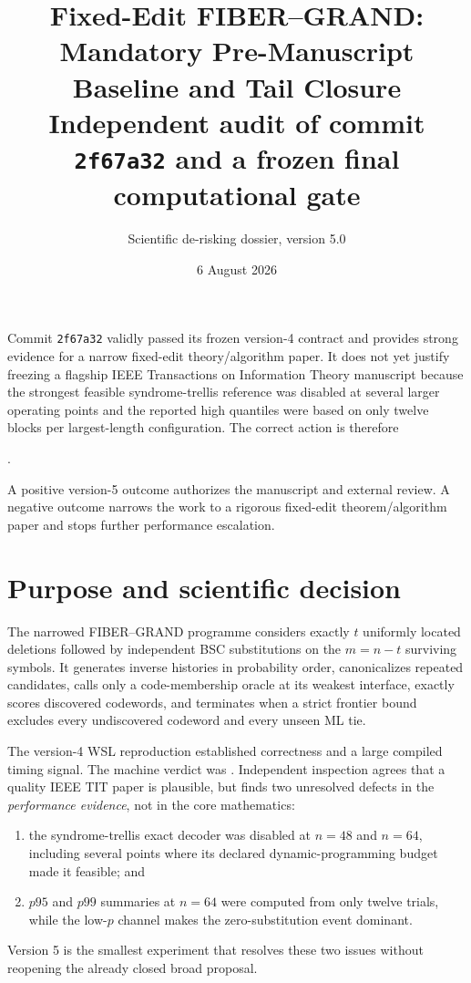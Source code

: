 \documentclass[11pt]{article}
\title{\textbf{Fixed-Edit FIBER--GRAND: Mandatory Pre-Manuscript Baseline and Tail Closure}\\[1.5mm]
\large Independent audit of commit \texttt{2f67a32} and a frozen final computational gate}
\author{Scientific de-risking dossier, version 5.0}
\date{6 August 2026}
\theoremstyle{definition}
\theoremstyle{remark}
\begin{document}
\maketitle

\begin{tcolorbox}[colback=blue!4,colframe=blue!55!black,title=Authoritative status]
Commit \texttt{2f67a32} validly passed its frozen version-4 contract and provides strong evidence for a narrow fixed-edit theory/algorithm paper.  It does not yet justify freezing a flagship IEEE Transactions on Information Theory manuscript because the strongest feasible syndrome-trellis reference was disabled at several larger operating points and the reported high quantiles were based on only twelve blocks per largest-length configuration.  The correct action is therefore
\begin{center}
\small{}.
\end{center}
A positive version-5 outcome authorizes the manuscript and external review.  A negative outcome narrows the work to a rigorous fixed-edit theorem/algorithm paper and stops further performance escalation.
\end{tcolorbox}

\tableofcontents
\newpage

\section{Purpose and scientific decision}
The narrowed FIBER--GRAND programme considers exactly $t$ uniformly located deletions followed by independent BSC substitutions on the $m=n-t$ surviving symbols.  It generates inverse histories in probability order, canonicalizes repeated candidates, calls only a code-membership oracle at its weakest interface, exactly scores discovered codewords, and terminates when a strict frontier bound excludes every undiscovered codeword and every unseen ML tie.

The version-4 WSL reproduction established correctness and a large compiled timing signal.  The machine verdict was .  Independent inspection agrees that a quality IEEE TIT paper is plausible, but finds two unresolved defects in the \emph{performance evidence}, not in the core mathematics:
\begin{enumerate}[label=(\roman*),leftmargin=2em]
\item the syndrome-trellis exact decoder was disabled at $n=48$ and $n=64$, including several points where its declared dynamic-programming budget made it feasible; and
\item $p95$ and $p99$ summaries at $n=64$ were computed from only twelve trials, while the low-$p$ channel makes the zero-substitution event dominant.
\end{enumerate}
Version 5 is the smallest experiment that resolves these two issues without reopening the already closed broad proposal.
\end{document}
